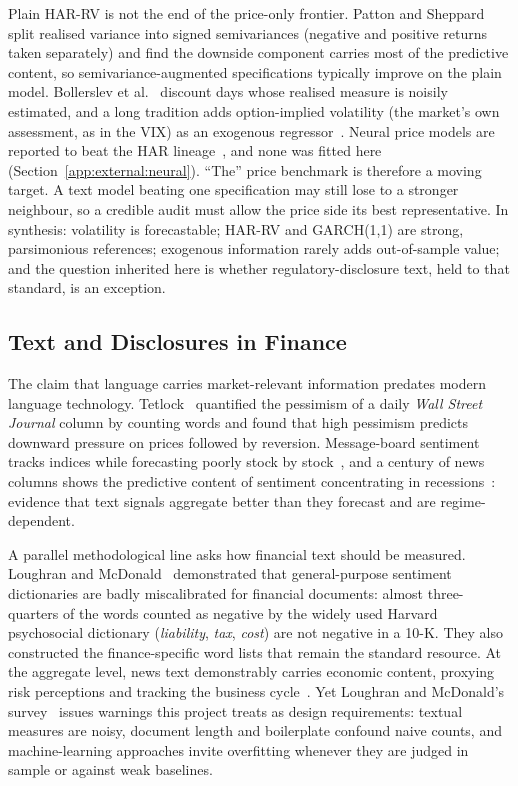 Plain HAR-RV is not the end of the price-only frontier. Patton and Sheppard~\cite{pattonsheppard2015shar} split realised variance into signed semivariances (negative and positive returns taken separately) and find the downside component carries most of the predictive content, so semivariance-augmented specifications typically improve on the plain model. Bollerslev et al.~\cite{bollerslev2016harq} discount days whose realised measure is noisily estimated, and a long tradition adds option-implied volatility (the market's own assessment, as in the VIX) as an exogenous regressor~\cite{blair2001forecasting}. Neural price models are reported to beat the HAR lineage~\cite{bucci2020neural,christensen2023mlvol}, and none was fitted here (Section~\ref{app:external:neural}). ``The'' price benchmark is therefore a moving target. A text model beating one specification may still lose to a stronger neighbour, so a credible audit must allow the price side its best representative. In synthesis: volatility is forecastable; HAR-RV and GARCH(1,1) are strong, parsimonious references; exogenous information rarely adds out-of-sample value; and the question inherited here is whether regulatory-disclosure text, held to that standard, is an exception.

\subsection{Text and Disclosures in Finance}
\label{sec:bg-text}

The claim that language carries market-relevant information predates modern language technology. Tetlock~\cite{tetlock2007giving} quantified the pessimism of a daily \emph{Wall Street Journal} column by counting words and found that high pessimism predicts downward pressure on prices followed by reversion. Message-board sentiment tracks indices while forecasting poorly stock by stock~\cite{das2007yahoo}, and a century of news columns %
shows the predictive content of sentiment concentrating in recessions~\cite{garcia2013sentiment}: evidence that text signals aggregate better than they forecast and are regime-dependent.

A parallel methodological line asks how financial text should be measured. Loughran and McDonald~\cite{loughran2011liability} demonstrated that general-purpose sentiment dictionaries are badly miscalibrated for financial documents: almost three-quarters of the words counted as negative by the widely used Harvard psychosocial dictionary (\emph{liability}, \emph{tax}, \emph{cost}) are not negative in a 10-K. %
They also constructed the finance-specific word lists that remain the standard resource. At the aggregate level, news text demonstrably carries economic content, proxying risk perceptions and tracking the business cycle~\cite{bybee2024business,manela2017nvix}. Yet Loughran and McDonald's survey~\cite{loughran2016survey} issues warnings this project treats as design requirements: textual measures are noisy, document length and boilerplate confound naive counts, and machine-learning approaches invite overfitting whenever they are judged in sample or against weak baselines.

